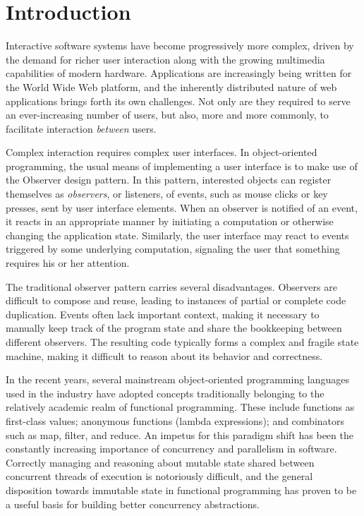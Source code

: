 \chapter{Introduction}

Interactive software systems have become progressively more complex, driven by the demand for richer user interaction along with the growing multimedia capabilities of modern hardware. Applications are increasingly being written for the World Wide Web platform, and the inherently distributed nature of web applications brings forth its own challenges. Not only are they required to serve an ever-increasing number of users, but also, more and more commonly, to facilitate interaction \emph{between} users. 

Complex interaction requires complex user interfaces. In object-oriented programming, the usual means of implementing a user interface is to make use of the Observer design pattern. In this pattern, interested objects can register themselves as \emph{observers}, or listeners, of events, such as mouse clicks or key presses, sent by user interface elements. When an observer is notified of an event, it reacts in an appropriate manner by initiating a computation or otherwise changing the application state. Similarly, the user interface may react to events triggered by some underlying computation, signaling the user that something requires his or her attention.

The traditional observer pattern carries several disadvantages. Observers are difficult to compose and reuse, leading to instances of partial or complete code duplication. Events often lack important context, making it necessary to manually keep track of the program state and share the bookkeeping between different observers. The resulting code typically forms a complex and fragile state machine, making it difficult to reason about its behavior and correctness.

In the recent years, several mainstream object-oriented programming languages used in the industry have adopted concepts traditionally belonging to the relatively academic realm of functional programming. These include functions as first-class values; anonymous functions (lambda expressions); and combinators such as map, filter, and reduce. An impetus for this paradigm shift has been the constantly increasing importance of concurrency and parallelism in software. Correctly managing and reasoning about mutable state shared between concurrent threads of execution is notoriously difficult, and the general disposition towards immutable state in functional programming has proven to be a useful basis for building better concurrency abstractions.

